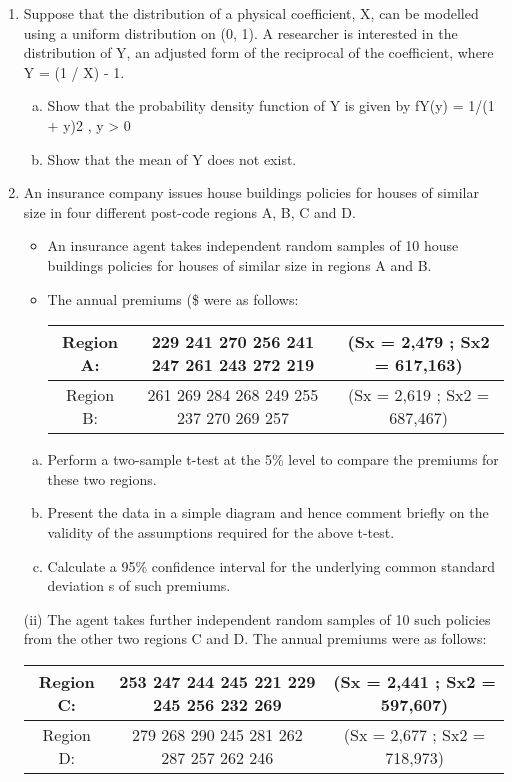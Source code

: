 \documentclass[a4paper,12pt]{article}
\begin{document}
\begin{enumerate}
\item Suppose that the distribution of a physical coefficient, X, can be modelled
using a uniform distribution on (0, 1). A researcher is interested in the
distribution of Y, an adjusted form of the reciprocal of the coefficient, where Y
= (1 / X) - 1.
\begin{enumerate}[(a)]
\item Show that the probability density function of Y is given by
fY(y) = 1/(1 + y)2 , y > 0 
\item Show that the mean of Y does not exist. 
\end{enumerate}
\item An insurance company issues house buildings policies for houses of similar
size in four different post-code regions A, B, C and D.
\begin{itemize}
\item  An insurance agent takes independent random samples of 10 house
buildings policies for houses of similar size in regions A and B.
\item The
annual premiums (\$ were as follows:

\begin{center}
 \begin{tabular}{c|c|c}\hline
Region A: & 229 241 270 256 241 247 261 243 272 219
& (Sx = 2,479 ; Sx2 = 617,163)\\  \hline
Region B: & 261 269 284 268 249 255 237 270 269 257
& (Sx = 2,619 ; Sx2 = 687,467)\\  \hline
\end{tabular}   
\end{center}

\end{itemize}
\begin{enumerate}[(a)]
\item Perform a two-sample t-test at the 5\% level to compare the
premiums for these two regions.
\item Present the data in a simple diagram and hence comment briefly
on the validity of the assumptions required for the above t-test.
\item Calculate a 95\% confidence interval for the underlying common
standard deviation s of such premiums. 
\end{enumerate}
(ii) The agent takes further independent random samples of 10 such
policies from the other two regions C and D. The annual premiums
were as follows:
\begin{center}
 \begin{tabular}{c|c|c}\hline
Region C: & 253 247 244 245 221 229 245 256 232 269
& (Sx = 2,441 ; Sx2 = 597,607)\\  \hline
Region D:&  279 268 290 245 281 262 287 257 262 246
& (Sx = 2,677 ; Sx2 = 718,973)\\  \hline
\end{tabular}   
\end{center}



\end{enumerate}
\end{document}
